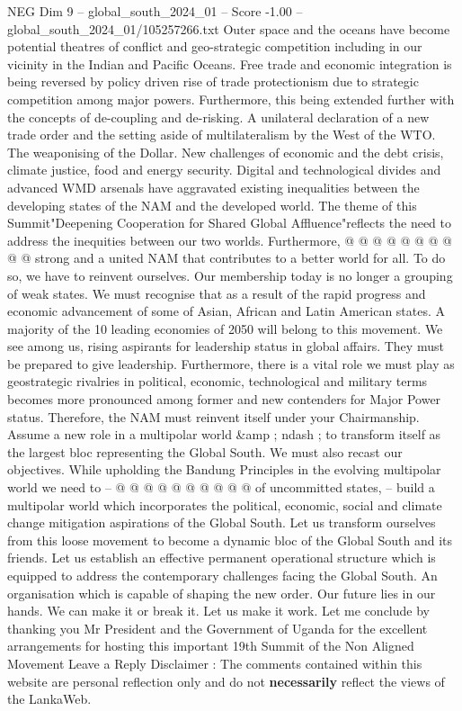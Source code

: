 \begin{textsample}{NEG Dim 9 – global\_south\_2024\_01 – Score -1.00 – global\_south\_2024\_01/105257266.txt}
Outer space and the oceans have become potential theatres of conflict and geo-strategic competition including in our vicinity in the Indian and Pacific Oceans.
Free trade and economic integration is being reversed by policy driven rise of trade protectionism due to strategic competition among major powers.
Furthermore, this being extended further with the concepts of de-coupling and de-risking.
A unilateral declaration of a new trade order and the setting aside of multilateralism by the West of the WTO.
The weaponising of the Dollar.
New challenges of economic and the debt crisis, climate justice, food and energy security.
Digital and technological divides and advanced WMD arsenals have aggravated existing inequalities between the developing states of the NAM and the developed world.
The theme of this Summit"Deepening Cooperation for Shared Global Affluence"reflects the need to address the inequities between our two worlds.
Furthermore, @ @ @ @ @ @ @ @ @ @ strong and a united NAM that contributes to a better world for all.
To do so, we have to reinvent ourselves.
Our membership today is no longer a grouping of weak states.
We must recognise that as a result of the rapid progress and economic advancement of some of Asian, African and Latin American states.
A majority of the 10 leading economies of 2050 will belong to this movement.
We see among us, rising aspirants for leadership status in global affairs.
They must be prepared to give leadership.
Furthermore, there is a vital role we must play as geostrategic rivalries in political, economic, technological and military terms becomes more pronounced among former and new contenders for Major Power status.
Therefore, the NAM must reinvent itself under your Chairmanship.
Assume a new role in a multipolar world \&amp ; ndash ; to transform itself as the largest bloc representing the Global South.
We must also recast our objectives.
While upholding the Bandung Principles in the evolving multipolar world we need to -- @ @ @ @ @ @ @ @ @ @ of uncommitted states, -- build a multipolar world which incorporates the political, economic, social and climate change mitigation aspirations of the Global South.
Let us transform ourselves from this loose movement to become a dynamic bloc of the Global South and its friends.
Let us establish an effective permanent operational structure which is equipped to address the contemporary challenges facing the Global South.
An organisation which is capable of shaping the new order.
Our future lies in our hands.
We can make it or break it.
Let us make it work.
Let me conclude by thanking you Mr President and the Government of Uganda for the excellent arrangements for hosting this important 19th Summit of the Non Aligned Movement Leave a Reply Disclaimer : The comments contained within this website are personal reflection only and do not \textbf{necessarily} reflect the views of the LankaWeb.

\end{textsample}
